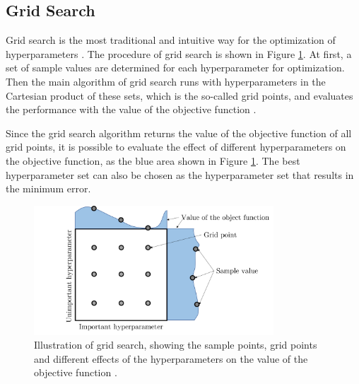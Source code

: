 



\subsection{Grid Search}
\label{gs}


Grid search is the most traditional and intuitive way for the optimization of hyperparameters \cite{ataei2004using}. The procedure of grid search is shown in Figure \ref{grid search}. At first, a set of sample values are determined for each hyperparameter for optimization. Then the main algorithm of grid search runs with hyperparameters in the Cartesian product of these sets, which is the so-called grid points, and evaluates the performance with the value of the objective function \cite{bergstra2012random}. 

Since the grid search algorithm returns the value of the objective function of all grid points, it is possible to evaluate the effect of different hyperparameters on the objective function, as the blue area shown in Figure \ref{grid search}. The best hyperparameter set can also be chosen as the hyperparameter set that results in the minimum error.

\begin{figure}[htb]
\centering
\includegraphics[width=0.8\textwidth]{figures/grid search.png}
\caption{Illustration of grid search, showing the sample points, grid points and different effects of the hyperparameters on the value of the objective function \cite{bergstra2012random}.}
\label{grid search}
\end{figure}

